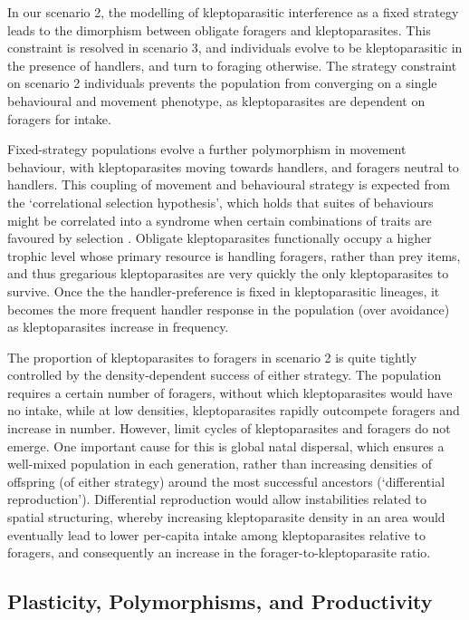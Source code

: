 \documentclass[11pt]{article}
\begin{document}
In our scenario 2, the modelling of kleptoparasitic interference as a fixed strategy leads to the dimorphism between obligate foragers and kleptoparasites.
This constraint is resolved in scenario 3, and individuals evolve to be kleptoparasitic in the presence of handlers, and turn to foraging otherwise.
The strategy constraint on scenario 2 individuals prevents the population from converging on a single behavioural and movement phenotype, as kleptoparasites are dependent on foragers for intake.

Fixed-strategy populations evolve a further polymorphism in movement behaviour, with kleptoparasites moving towards handlers, and foragers neutral to handlers.
This coupling of movement and behavioural strategy is expected from the `correlational selection hypothesis', which holds that suites of behaviours might be correlated into a syndrome when certain combinations of traits are favoured by selection \citep{wolf2010,sih2004}.
Obligate kleptoparasites functionally occupy a higher trophic level whose primary resource is handling foragers, rather than prey items, and thus gregarious kleptoparasites are very quickly the only kleptoparasites to survive.
Once the the handler-preference is fixed in kleptoparasitic lineages, it becomes the more frequent handler response in the population (over avoidance) as kleptoparasites increase in frequency.

The proportion of kleptoparasites to foragers in scenario 2 is quite tightly controlled by the density-dependent success of either strategy.
The population requires a certain number of foragers, without which kleptoparasites would have no intake, while at low densities, kleptoparasites rapidly outcompete foragers and increase in number.
However, limit cycles of kleptoparasites and foragers do not emerge.
One important cause for this is global natal dispersal, which ensures a well-mixed population in each generation, rather than increasing densities of offspring (of either strategy) around the most successful ancestors (`differential reproduction').
Differential reproduction would allow instabilities related to spatial structuring, whereby increasing kleptoparasite density in an area would eventually lead to lower per-capita intake among kleptoparasites relative to foragers, and consequently an increase in the forager-to-kleptoparasite ratio.

\subsection{Plasticity, Polymorphisms, and Productivity}
\end{document}
